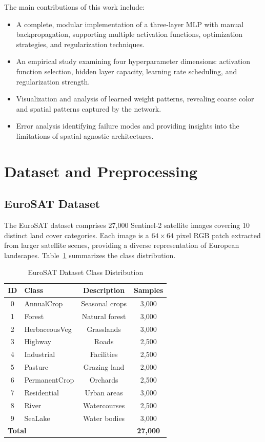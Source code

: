 \documentclass[sigconf,nonacm]{acmart}
\begin{document}
The main contributions of this work include:
\begin{itemize}
    \item A complete, modular implementation of a three-layer MLP with manual backpropagation, supporting multiple activation functions, optimization strategies, and regularization techniques.
    \item An empirical study examining four hyperparameter dimensions: activation function selection, hidden layer capacity, learning rate scheduling, and regularization strength.
    \item Visualization and analysis of learned weight patterns, revealing coarse color and spatial patterns captured by the network.
    \item Error analysis identifying failure modes and providing insights into the limitations of spatial-agnostic architectures.
\end{itemize}

\section{Dataset and Preprocessing}

\subsection{EuroSAT Dataset}

The EuroSAT dataset comprises 27,000 Sentinel-2 satellite images covering 10 distinct land cover categories. Each image is a $64 \times 64$ pixel RGB patch extracted from larger satellite scenes, providing a diverse representation of European landscapes. Table~\ref{tab:classes} summarizes the class distribution.

\begin{table}[htbp]
\caption{EuroSAT Dataset Class Distribution}
\label{tab:classes}
\centering
\small
\begin{tabular}{clcc}
\toprule
ID & Class & Description & Samples \\
\midrule
0 & AnnualCrop & Seasonal crops & 3,000 \\
1 & Forest & Natural forest & 3,000 \\
2 & HerbaceousVeg & Grasslands & 3,000 \\
3 & Highway & Roads & 2,500 \\
4 & Industrial & Facilities & 2,500 \\
5 & Pasture & Grazing land & 2,000 \\
6 & PermanentCrop & Orchards & 2,500 \\
7 & Residential & Urban areas & 3,000 \\
8 & River & Watercourses & 2,500 \\
9 & SeaLake & Water bodies & 3,000 \\
\midrule
\multicolumn{3}{l}{\textbf{Total}} & \textbf{27,000} \\
\bottomrule
\end{tabular}
\end{table}
\end{document}
